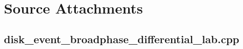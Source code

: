 \documentclass[11pt,twoside,openany]{book}
\begin{document}
\chapter{Source Attachments}
\hypertarget{source-file-352cdda3503a7fe277bf96f6}{}
\label{attachmentstart:source-file-352cdda3503a7fe277bf96f6}
\section*{disk\_event\_broadphase\_differential\_lab.cpp}
\end{document}
